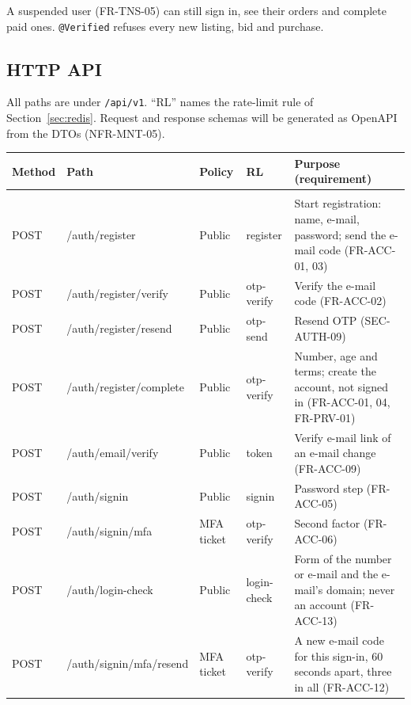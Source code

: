 \documentclass[11pt,a4paper]{article}
\begin{document}
A suspended user (FR-TNS-05) can still sign in, see their orders and complete paid ones. \texttt{@Verified} refuses every new listing, bid and purchase.

\subsection{HTTP API}
\label{sec:api}
All paths are under \texttt{/api/v1}. ``RL'' names the rate-limit rule of Section~\ref{sec:redis}. Request and response schemas will be generated as OpenAPI from the DTOs (NFR-MNT-05).

{\small
\begin{longtable}{@{}>{\ttfamily\raggedright\arraybackslash}p{1.15cm}>{\ttfamily\raggedright\arraybackslash}p{5.0cm}>{\raggedright\arraybackslash}p{2.6cm}>{\raggedright\arraybackslash}p{1.5cm}>{\raggedright\arraybackslash}p{4.4cm}@{}}
\toprule
\textnormal{\textbf{Method}} & \textnormal{\textbf{Path}} & \textbf{Policy} & \textbf{RL} & \textbf{Purpose (requirement)} \\ \midrule \endhead
\multicolumn{5}{@{}l}{\textbf{Registration and sign-in}} \\
POST & /\allowbreak auth/\allowbreak register & Public & register & Start registration: name, e-mail, password; send the e-mail code (FR-ACC-01, 03) \\
POST & /\allowbreak auth/\allowbreak register/\allowbreak verify & Public & otp-verify & Verify the e-mail code (FR-ACC-02) \\
POST & /\allowbreak auth/\allowbreak register/\allowbreak resend & Public & otp-send & Resend OTP (SEC-AUTH-09) \\
POST & /\allowbreak auth/\allowbreak register/\allowbreak complete & Public & otp-verify & Number, age and terms; create the account, not signed in (FR-ACC-01, 04, FR-PRV-01) \\
POST & /\allowbreak auth/\allowbreak email/\allowbreak verify & Public & token & Verify e-mail link of an e-mail change (FR-ACC-09) \\
POST & /\allowbreak auth/\allowbreak signin & Public & signin & Password step (FR-ACC-05) \\
POST & /\allowbreak auth/\allowbreak signin/\allowbreak mfa & MFA ticket & otp-verify & Second factor (FR-ACC-06) \\
POST & /\allowbreak auth/\allowbreak login-check & Public & login-check & Form of the number or e-mail and the e-mail's domain; never an account (FR-ACC-13) \\
POST & /\allowbreak auth/\allowbreak signin/\allowbreak mfa/\allowbreak resend & MFA ticket & otp-verify & A new e-mail code for this sign-in, 60 seconds apart, three in all (FR-ACC-12) \\

\end{longtable}}
\end{document}

